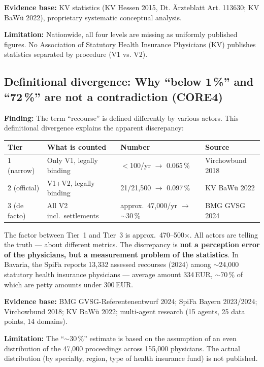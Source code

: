 \documentclass{umbruch-position}
\begin{document}
\textbf{Evidence base:} KV statistics (KV Hessen 2015, Dt. \"Arzteblatt Art. 113630; KV BaW\"u 2022), proprietary systematic conceptual analysis.

\textbf{Limitation:} Nationwide, all four levels are missing as uniformly published figures. No Association of Statutory Health Insurance Physicians (KV) publishes statistics separated by procedure (V1 vs. V2).

\subsection{Definitional divergence: Why ``below 1\,\%'' and ``72\,\%'' are not a contradiction (CORE4)}

\textbf{Finding:} The term ``recourse'' is defined differently by various actors. This definitional divergence explains the apparent discrepancy:

\smallskip
{\small
\begin{tabularx}{\textwidth}{l p{4.5cm} l l}
\hline
\textbf{Tier} & \textbf{What is counted} & \textbf{Number} & \textbf{Source} \\
\hline
1 (narrow) & Only V1, legally binding & ${<}$100/yr $\to$ 0.065\,\% & Virchowbund 2018 \\
2 (official) & V1+V2, legally binding & 21/21,500 $\to$ 0.097\,\% & KV BaW\"u 2022 \\
3 (de facto) & All V2 incl.\ settlements & approx.\ 47,000/yr $\to$ ${\sim}$30\,\% & BMG GVSG 2024 \\
\hline
\end{tabularx}
}
\smallskip

The factor between Tier~1 and Tier~3 is approx.\ 470--500$\times$. All actors are telling the truth --- about different metrics. The discrepancy is \textbf{not a perception error of the physicians, but a measurement problem of the statistics}. In Bavaria, the SpiFa reports 13,332 assessed recourses (2024) among $\sim$24,000 statutory health insurance physicians --- average amount 334\,EUR, $\sim$70\,\% of which are petty amounts under 300\,EUR.

\textbf{Evidence base:} BMG GVSG-Referentenentwurf 2024; SpiFa Bayern 2023/2024; Virchowbund 2018; KV BaW\"u 2022; multi-agent research (15 agents, 25 data points, 14 domains).

\textbf{Limitation:} The ``${\sim}$30\,\%'' estimate is based on the assumption of an even distribution of the 47,000 proceedings across 155,000 physicians. The actual distribution (by specialty, region, type of health insurance fund) is not published.
\end{document}
